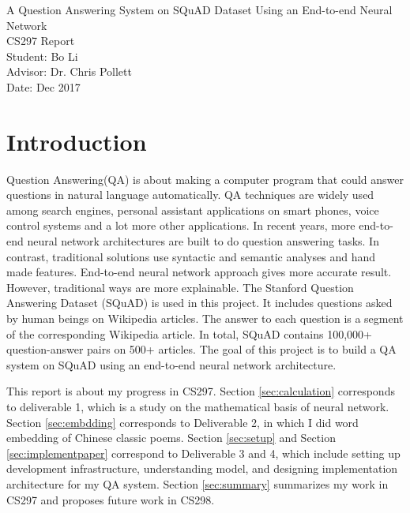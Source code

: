 \documentclass[12pt]{article}
\begin{document}
\begin{titlepage}
\begin{center}
        \vspace*{3cm}
        {\Huge A Question Answering System on SQuAD Dataset Using an End-to-end Neural Network}\\

        \vspace*{3cm}
        {\Huge CS297 Report}\\

        \vspace{3 cm}
        Student: Bo Li\\
        Advisor: Dr. Chris Pollett\\
        Date: Dec 2017

 \end{center}
\clearpage
\end{titlepage}

\begin{titlepage}
\tableofcontents
\clearpage
\end{titlepage}



\section{Introduction}

Question Answering(QA) is about making a computer program that could answer questions in natural language automatically. QA techniques are widely used among search engines, personal assistant applications on smart phones, voice control systems and a lot more other applications. In recent years, more end-to-end neural network architectures are built to do question answering tasks. In contrast, traditional solutions use syntactic and semantic analyses and hand made features. End-to-end neural network approach gives more accurate result. However, traditional ways are more explainable. The Stanford Question Answering Dataset (SQuAD) is used in this project. It includes questions asked by human beings on Wikipedia articles. The answer to each question is a segment of the corresponding Wikipedia article\cite{rajpurkar2016squad}. In total, SQuAD contains 100,000+ question-answer pairs on 500+ articles\cite{rajpurkar2016squad}. The goal of this project is to build a QA system on SQuAD using an end-to-end neural network architecture.

This report is about my progress in CS297. Section \ref{sec:calculation}  corresponds to deliverable 1, which is a study on the mathematical basis of neural network. Section \ref{sec:embdding} corresponds to Deliverable 2, in which I did word embedding of Chinese classic poems. Section \ref{sec:setup} and Section \ref{sec:implementpaper} correspond to Deliverable 3 and 4, which include setting up development infrastructure, understanding model, and designing implementation architecture for my QA system. Section \ref{sec:summary} summarizes my work in CS297 and proposes future work in CS298.
\end{document}
